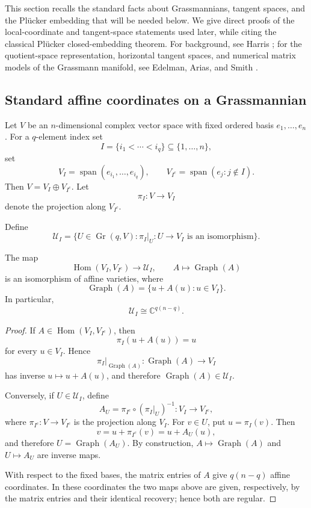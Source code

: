 \documentclass{siamonline250211}
\newcommand{\CC}{\mathbb C}
\newcommand{\Gr}{\operatorname{Gr}}
\newcommand{\Hom}{\operatorname{Hom}}
\newcommand{\Span}{\operatorname{span}}
\newcommand{\cU}{\mathcal U}
\begin{document}
This section recalls the standard facts about Grassmannians, tangent spaces, and
the Pl\"ucker embedding that will be needed below. We give direct proofs of the
local-coordinate and tangent-space statements used later, while citing the
classical Pl\"ucker closed-embedding theorem. For background, see Harris
\cite[Lecture~6, pp.~63--67]{Har92}; for the quotient-space representation,
horizontal tangent spaces, and numerical matrix models of the Grassmann
manifold, see Edelman, Arias, and Smith
\cite[Secs.~2.3.2 and 2.5]{EAS98}.

\subsection{Standard affine coordinates on a Grassmannian}

Let $V$ be an $n$-dimensional complex vector space with fixed ordered basis
$e_1,\ldots,e_n$. For a $q$-element index set
\[
  I=\{i_1<\cdots<i_q\}\subseteq\{1,\ldots,n\},
\]
set
\[
  V_I=\Span(e_{i_1},\ldots,e_{i_q}),
  \qquad
  V_{I^c}=\Span(e_j:j\notin I).
\]
Then $V=V_I\oplus V_{I^c}$. Let
\[
  \pi_I:V\longrightarrow V_I
\]
denote the projection along $V_{I^c}$.

\begin{definition}\label{def:grassmann-chart}
Define
\[
  \cU_I
  =\{U\in\Gr(q,V):\pi_I|_U:U\to V_I\text{ is an isomorphism}\}.
\]
\end{definition}

\begin{proposition}\label{prop:graph-chart}
The map
\[
  \Hom(V_I,V_{I^c})\longrightarrow\cU_I,
  \qquad
  A\longmapsto\operatorname{Graph}(A)
\]
is an isomorphism of affine varieties, where
\[
  \operatorname{Graph}(A)=\{u+A(u):u\in V_I\}.
\]
In particular,
\[
  \cU_I\cong\CC^{q(n-q)}.
\]
\end{proposition}

\begin{proof}
If $A\in\Hom(V_I,V_{I^c})$, then
\[
  \pi_I(u+A(u))=u
\]
for every $u\in V_I$. Hence
\[
  \pi_I|_{\operatorname{Graph}(A)}:
  \operatorname{Graph}(A)\longrightarrow V_I
\]
has inverse $u\mapsto u+A(u)$, and therefore
$\operatorname{Graph}(A)\in\cU_I$.

Conversely, if $U\in\cU_I$, define
\[
  A_U=\pi_{I^c}\circ(\pi_I|_U)^{-1}:V_I\longrightarrow V_{I^c},
\]
where $\pi_{I^c}:V\to V_{I^c}$ is the projection along $V_I$. For $v\in U$,
put $u=\pi_I(v)$. Then
\[
  v=u+\pi_{I^c}(v)=u+A_U(u),
\]
and therefore $U=\operatorname{Graph}(A_U)$. By construction,
$A\mapsto\operatorname{Graph}(A)$ and $U\mapsto A_U$ are inverse maps.

With respect to the fixed bases, the matrix entries of $A$ give $q(n-q)$ affine
coordinates. In these coordinates the two maps above are given, respectively,
by the matrix entries and their identical recovery; hence both are regular.
\end{proof}
\end{document}
